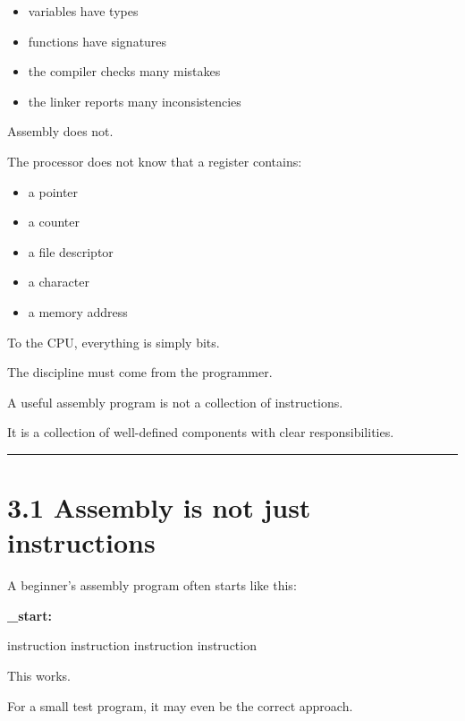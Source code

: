 \documentclass[
  oneside,
  openany]{book}
\newenvironment{Shaded}{\begin{snugshade}}{\end{snugshade}}
\newcommand{\FunctionTok}[1]{\textcolor[rgb]{0.13,0.29,0.53}{\textbf{#1}}}
\newcommand{\NormalTok}[1]{#1}
\providecommand{\tightlist}{%
  \setlength{\itemsep}{0pt}\setlength{\parskip}{0pt}}
\begin{document}
\begin{itemize}
\tightlist
\item
  variables have types
\item
  functions have signatures
\item
  the compiler checks many mistakes
\item
  the linker reports many inconsistencies
\end{itemize}

Assembly does not.

The processor does not know that a register contains:

\begin{itemize}
\tightlist
\item
  a pointer
\item
  a counter
\item
  a file descriptor
\item
  a character
\item
  a memory address
\end{itemize}

To the CPU, everything is simply bits.

The discipline must come from the programmer.

A useful assembly program is not a collection of instructions.

It is a collection of well-defined components with clear
responsibilities.

\begin{center}\rule{0.5\linewidth}{0.5pt}\end{center}

\hypertarget{assembly-is-not-just-instructions}{%
\section{3.1 Assembly is not just
instructions}\label{assembly-is-not-just-instructions}}

A beginner's assembly program often starts like this:

\begin{Shaded}
\begin{Highlighting}[]
\FunctionTok{\_start:}

\NormalTok{    instruction}
\NormalTok{    instruction}
\NormalTok{    instruction}
\NormalTok{    instruction}
\end{Highlighting}
\end{Shaded}

This works.

For a small test program, it may even be the correct approach.
\end{document}
